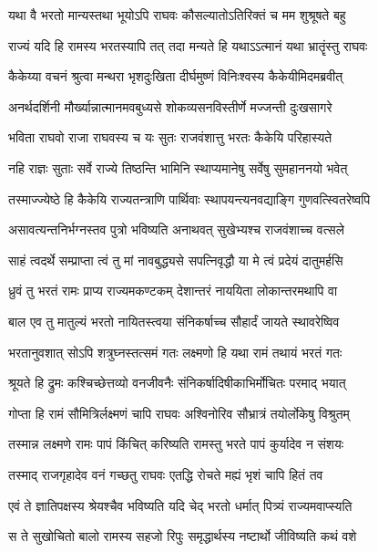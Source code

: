 \twolineshloka
{यथा वै भरतो मान्यस्तथा भूयोऽपि राघवः}
{कौसल्यातोऽतिरिक्तं च मम शुश्रूषते बहु} %

\twolineshloka
{राज्यं यदि हि रामस्य भरतस्यापि तत् तदा}
{मन्यते हि यथाऽऽत्मानं यथा भ्रातॄंस्तु राघवः} %

\twolineshloka
{कैकेय्या वचनं श्रुत्वा मन्थरा भृशदुःखिता}
{दीर्घमुष्णं विनिःश्वस्य कैकेयीमिदमब्रवीत्} %

\twolineshloka
{अनर्थदर्शिनी मौर्ख्यान्नात्मानमवबुध्यसे}
{शोकव्यसनविस्तीर्णे मज्जन्ती दुःखसागरे} %

\twolineshloka
{भविता राघवो राजा राघवस्य च यः सुतः}
{राजवंशात्तु भरतः कैकेयि परिहास्यते} %

\twolineshloka
{नहि राज्ञः सुताः सर्वे राज्ये तिष्ठन्ति भामिनि}
{स्थाप्यमानेषु सर्वेषु सुमहाननयो भवेत्} %

\twolineshloka
{तस्माज्ज्येष्ठे हि कैकेयि राज्यतन्त्राणि पार्थिवाः}
{स्थापयन्त्यनवद्याङ्गि गुणवत्स्वितरेष्वपि} %

\twolineshloka
{असावत्यन्तनिर्भग्नस्तव पुत्रो भविष्यति}
{अनाथवत् सुखेभ्यश्च राजवंशाच्च वत्सले} %

\twolineshloka
{साहं त्वदर्थे सम्प्राप्ता त्वं तु मां नावबुद्ध्यसे}
{सपत्निवृद्धौ या मे त्वं प्रदेयं दातुमर्हसि} %

\twolineshloka
{ध्रुवं तु भरतं रामः प्राप्य राज्यमकण्टकम्}
{देशान्तरं नाययिता लोकान्तरमथापि वा} %

\twolineshloka
{बाल एव तु मातुल्यं भरतो नायितस्त्वया}
{संनिकर्षाच्च सौहार्दं जायते स्थावरेष्विव} %

\twolineshloka
{भरतानुवशात् सोऽपि शत्रुघ्नस्तत्समं गतः}
{लक्ष्मणो हि यथा रामं तथायं भरतं गतः} %

\twolineshloka
{श्रूयते हि द्रुमः कश्चिच्छेत्तव्यो वनजीवनैः}
{संनिकर्षादिषीकाभिर्मोचितः परमाद् भयात्} %

\twolineshloka
{गोप्ता हि रामं सौमित्रिर्लक्ष्मणं चापि राघवः}
{अश्विनोरिव सौभ्रात्रं तयोर्लोकेषु विश्रुतम्} %

\twolineshloka
{तस्मान्न लक्ष्मणे रामः पापं किंचित् करिष्यति}
{रामस्तु भरते पापं कुर्यादेव न संशयः} %

\twolineshloka
{तस्माद् राजगृहादेव वनं गच्छतु राघवः}
{एतद्धि रोचते मह्यं भृशं चापि हितं तव} %

\twolineshloka
{एवं ते ज्ञातिपक्षस्य श्रेयश्चैव भविष्यति}
{यदि चेद् भरतो धर्मात् पित्र्यं राज्यमवाप्स्यति} %

\twolineshloka
{स ते सुखोचितो बालो रामस्य सहजो रिपुः}
{समृद्धार्थस्य नष्टार्थो जीविष्यति कथं वशे} %

